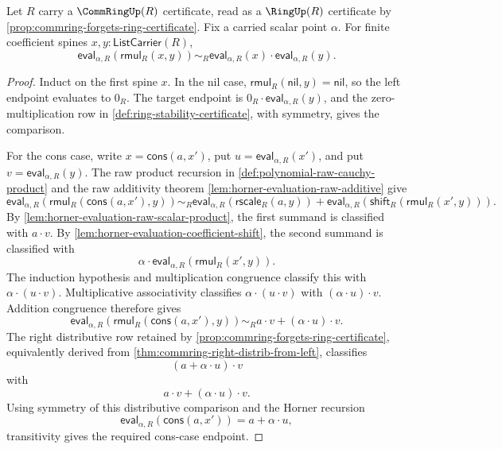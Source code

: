 \begin{lemma}
\label{lem:horner-evaluation-raw-multiplicative}
Let $R$ carry a $\CommRingUp(R)$ certificate, read as a $\RingUp(R)$ certificate by \autoref{prop:commring-forgets-ring-certificate}. Fix a carried scalar point $\alpha$. For finite coefficient spines $x,y:\mathsf{ListCarrier}(R)$,
$$
\mathsf{eval}_{\alpha,R}(\mathsf{rmul}_R(x,y))\sim_R
\mathsf{eval}_{\alpha,R}(x)\cdot\mathsf{eval}_{\alpha,R}(y).
$$
\end{lemma}
\begin{proof}
Induct on the first spine $x$. In the nil case, $\mathsf{rmul}_R(\mathsf{nil},y)=\mathsf{nil}$, so the left endpoint evaluates to $0_R$. The target endpoint is $0_R\cdot\mathsf{eval}_{\alpha,R}(y)$, and the zero-multiplication row in \autoref{def:ring-stability-certificate}, with symmetry, gives the comparison.

For the cons case, write $x=\mathsf{cons}(a,x')$, put $u=\mathsf{eval}_{\alpha,R}(x')$, and put $v=\mathsf{eval}_{\alpha,R}(y)$. The raw product recursion in \autoref{def:polynomial-raw-cauchy-product} and the raw additivity theorem \autoref{lem:horner-evaluation-raw-additive} give
$$
\mathsf{eval}_{\alpha,R}(\mathsf{rmul}_R(\mathsf{cons}(a,x'),y))\sim_R
\mathsf{eval}_{\alpha,R}(\mathsf{rscale}_R(a,y))+
\mathsf{eval}_{\alpha,R}(\mathsf{shift}_R(\mathsf{rmul}_R(x',y))).
$$
By \autoref{lem:horner-evaluation-raw-scalar-product}, the first summand is classified with $a\cdot v$. By \autoref{lem:horner-evaluation-coefficient-shift}, the second summand is classified with
$$
\alpha\cdot\mathsf{eval}_{\alpha,R}(\mathsf{rmul}_R(x',y)).
$$
The induction hypothesis and multiplication congruence classify this with $\alpha\cdot(u\cdot v)$. Multiplicative associativity classifies $\alpha\cdot(u\cdot v)$ with $(\alpha\cdot u)\cdot v$. Addition congruence therefore gives
$$
\mathsf{eval}_{\alpha,R}(\mathsf{rmul}_R(\mathsf{cons}(a,x'),y))\sim_R
 a\cdot v+(\alpha\cdot u)\cdot v.
$$
The right distributive row retained by \autoref{prop:commring-forgets-ring-certificate}, equivalently derived from \autoref{thm:commring-right-distrib-from-left}, classifies
$$
(a+\alpha\cdot u)\cdot v
$$
with
$$
a\cdot v+(\alpha\cdot u)\cdot v.
$$
Using symmetry of this distributive comparison and the Horner recursion
$$
\mathsf{eval}_{\alpha,R}(\mathsf{cons}(a,x'))=a+\alpha\cdot u,
$$
transitivity gives the required cons-case endpoint.
\end{proof}

